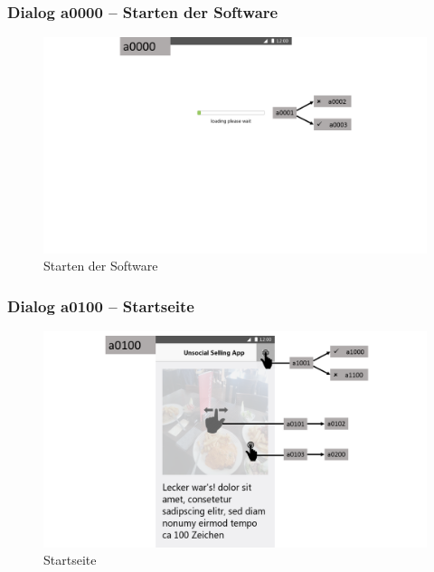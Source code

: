\documentclass[a4paper,12pt,oneside]{scrartcl}
\begin{document}
\subsubsection{Dialog a0000 – Starten der Software}
\begin{figure}[!htbp]
\centering
\noindent\includegraphics[width=\linewidth,height=\textheight,keepaspectratio]{Dialoge/Folie1}
\caption{Starten der Software}
\end{figure}
\FloatBarrier

\subsubsection{Dialog a0100 – Startseite}
\begin{figure}[!htbp]
\centering
\noindent\includegraphics[width=\linewidth,height=\textheight,keepaspectratio]{Dialoge/Folie2}
\caption{Startseite}
\end{figure}
\FloatBarrier
\end{document}

